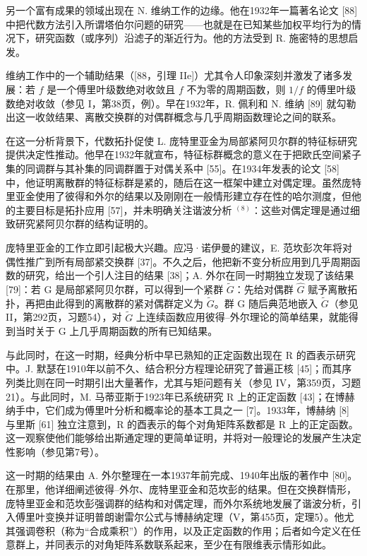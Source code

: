 另一个富有成果的领域出现在 N. 维纳工作的边缘。他在1932年一篇著名论文 {[}88{]} 中把代数方法引入所谓塔伯尔问题的研究——也就是在已知某些加权平均行为的情况下，研究函数（或序列）沿滤子的渐近行为。他的方法受到 R. 施密特的思想启发。

维纳工作中的一个辅助结果（{[}88，引理 IIe{]}）尤其令人印象深刻并激发了诸多发展：若 \(f\) 是一个傅里叶级数绝对收敛且 \(f\) 不为零的周期函数，则 \(1/f\) 的傅里叶级数绝对收敛（参见 I，第38页，例）。早在1932年，R. 佩利和 N. 维纳 {[}89{]} 就勾勒出这一收敛结果、离散交换群的对偶群概念与几乎周期函数理论之间的联系。

在这一分析背景下，代数拓扑促使 L. 庞特里亚金为局部紧阿贝尔群的特征标研究提供决定性推动。他早在1932年就宣布，特征标群概念的意义在于把欧氏空间紧子集的同调群与其补集的同调群置于对偶关系中 {[}55{]}。在1934年发表的论文 {[}58{]} 中，他证明离散群的特征标群是紧的，随后在这一框架中建立对偶定理。虽然庞特里亚金使用了彼得和外尔的结果以及刚刚在一般情形建立存在性的哈尔测度，但他的主要目标是拓扑应用 {[}57{]}，并未明确关注谐波分析 \(^{(8)}\)：这些对偶定理是通过细致研究紧阿贝尔群的结构证明的。

庞特里亚金的工作立即引起极大兴趣。应冯·诺伊曼的建议，E. 范坎彭次年将对偶性推广到所有局部紧交换群 {[}37{]}。不久之后，他把新不变分析应用到几乎周期函数的研究，给出一个引人注目的结果 {[}38{]}；A. 外尔在同一时期独立发现了该结果 {[}79{]}：若 G 是局部紧阿贝尔群，可以得到一个紧群 \(\widetilde{G}\)：先给对偶群 \(\widehat{G}\) 赋予离散拓扑，再把由此得到的离散群的紧对偶群定义为 \(\widetilde{G}\)。群 G 随后典范地嵌入 \(\widetilde{G}\)（参见 II，第292页，习题54），对 \(\widetilde{G}\) 上连续函数应用彼得--外尔理论的简单结果，就能得到当时关于 G 上几乎周期函数的所有已知结果。

与此同时，在这一时期，经典分析中早已熟知的正定函数出现在 R 的酉表示研究中。J. 默瑟在1910年以前不久、结合积分方程理论研究了普遍正核 {[}45{]}；而其序列类比则在同一时期引出大量著作，尤其与矩问题有关（参见 IV，第359页，习题21）。与此同时，M. 马蒂亚斯于1923年已系统研究 R 上的正定函数 {[}43{]}；在博赫纳手中，它们成为傅里叶分析和概率论的基本工具之一 {[}7{]}。1933年，博赫纳 {[}8{]} 与里斯 {[}61{]} 独立注意到，R 的酉表示的每个对角矩阵系数都是 R 上的正定函数。这一观察使他们能够给出斯通定理的更简单证明，并将对一般理论的发展产生决定性影响（参见第7号）。

这一时期的结果由 A. 外尔整理在一本1937年前完成、1940年出版的著作中 {[}80{]}。在那里，他详细阐述彼得--外尔、庞特里亚金和范坎彭的结果。但在交换群情形，庞特里亚金和范坎彭强调群的结构和对偶定理，而外尔系统地发展了谐波分析，引入傅里叶变换并证明普朗谢雷尔公式与博赫纳定理（V，第455页，定理5）。他尤其强调卷积（称为“合成乘积”）的作用，以及正定函数的作用；后者如今定义在任意群上，并同表示的对角矩阵系数联系起来，至少在有限维表示情形如此。

